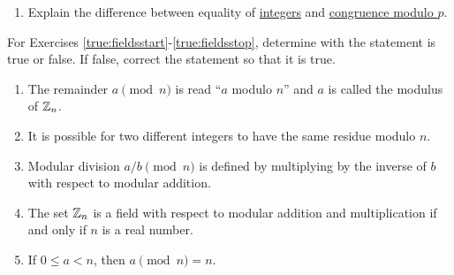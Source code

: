 
\begin{enumerate}[!HW!, start=1]
\item Explain the difference between equality of \hyperref[note:integers]{integers} and \hyperref[def:modularcongruence]{congruence modulo $p$}. %
\end{enumerate}

\noindent For Exercises \ref{true:fieldsstart}-\ref{true:fieldsstop}, determine with the statement is true or false. If false, correct the statement so that it is true.
\begin{enumerate}[!HW!]
\item\label{true:fieldsstart} The remainder $a\pmod n$ is read ``$a$ modulo $n$'' and $a$ is called the modulus of \hyperref[note:mod]{$\mathbb{Z}_n$}. %
\item It is possible for two different integers to have the same residue modulo $n$. %
\item Modular division $a/b\pmod n$ is defined by multiplying by the inverse of $b$ with respect to modular addition. %
\item The set $\mathbb{Z}_n$ is a field with respect to modular addition and multiplication if and only if $n$ is a real number. %
\item\label{true:fieldsstop} If $0\le a< n$, then $a\pmod n=n$.\\ %
\end{enumerate}

